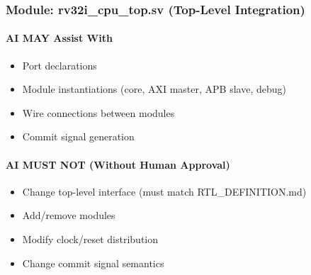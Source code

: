\subsubsection{\texorpdfstring{Module:
rv32i\_\allowbreak{}cpu\_\allowbreak{}top.sv (Top-Level
Integration)}{Module: rv32i\_cpu\_top.sv (Top-Level Integration)}}\label{cr:status:phase1-ai-human-responsibilities:module-rv32i-cpu-topsv-top-level-integration}

\paragraph{\texorpdfstring{\ok{} AI MAY Assist
With}{ AI MAY Assist With}}\label{cr:status:phase1-ai-human-responsibilities:white-check-mark-ai-may-assist-with-9}

\begin{record}

\begin{itemize}
\tightlist
\item
  Port declarations
\item
  Module instantiations (core, AXI master, APB slave, debug)
\item
  Wire connections between modules
\item
  Commit signal generation
\end{itemize}

\end{record}

\paragraph{\texorpdfstring{\warn{} AI MUST NOT (Without Human
Approval)}{ AI MUST NOT (Without Human Approval)}}\label{cr:status:phase1-ai-human-responsibilities:warning-ai-must-not-without-human-approval-9}

\begin{record}

\begin{itemize}
\tightlist
\item
  Change top-level interface (must match
  RTL\_\allowbreak{}DEFINITION.md)
\item
  Add/\allowbreak{}remove modules
\item
  Modify clock/\allowbreak{}reset distribution
\item
  Change commit signal semantics
\end{itemize}

\end{record}

